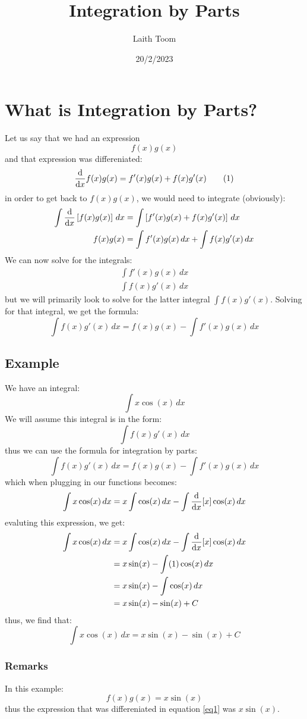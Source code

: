 \documentclass{article}
\title{Integration by Parts}
\author{Laith Toom}
\date{20/2/2023}
\begin{document}
\maketitle
\newpage

\section{What is Integration by Parts?}
Let us say that we had an expression
\[ f(x)g(x) \]
and that expression was differeniated:
\[ \derivative{}{x}f(x)g(x) = f'(x)g(x) + f(x)g'(x) \tag{1}\label{eq1} \]
in order to get back to $f(x)g(x)$, we would need to integrate (obviously):
\begin{align*}
    \int \derivative{}{x}\left[f(x)g(x)\right] \,dx &= \int \left[f'(x)g(x) + f(x)g'(x)\right] \,dx \\
    f(x)g(x) &= \int f'(x)g(x) \,dx + \int f(x)g'(x) \,dx 
\end{align*}
We can now solve for the integrals:
\begin{align*}
    \int f'(x)g(x) \,dx \\
    \int f(x)g'(x) \,dx
\end{align*}
but we will primarily look to solve for the latter integral $\int f(x)g'(x)$.
Solving for that integral, we get the formula:
\[ \boxed{ \int f(x)g'(x) \,dx = f(x)g(x) - \int f'(x)g(x) \,dx } \tag{2}\label{formula1} \]

\subsection{Example}
We have an integral:
\[ \int x\cos(x) \,dx \]
We will assume this integral is in the form:
\[ \int f(x)g'(x) \,dx \]
thus we can use the formula for integration by parts:
\[ \int f(x)g'(x) \,dx = f(x)g(x) - \int f'(x)g(x) \,dx \]
which when plugging in our functions becomes:
\[ \int x\cos(x) \,dx = x\int \cos(x) \,dx - \int \derivative{}{x}[x]\cos(x) \,dx \]
evaluting this expression, we get:
\begin{subequations}
    \begin{align}
        \int x\cos(x) \,dx &= x\int \cos(x) \,dx - \int \derivative{}{x}[x]\cos(x) \,dx \\      
                           &= x\sin(x) - \int (1)\cos(x) \,dx \\
                           &= x\sin(x) - \int \cos(x) \,dx \\
                           &= x\sin(x) - \sin(x) + C
    \end{align}
\end{subequations}
thus, we find that:
\[ \boxed{ \int x\cos(x) \,dx = x\sin(x) - \sin(x) + C } \]

\subsubsection{Remarks}
In this example:
\[ f(x)g(x) = x\sin(x) \]
thus the expression that was differeniated in equation \ref{eq1} was $x\sin(x)$.
\end{document}
